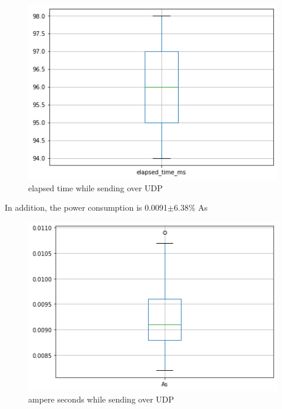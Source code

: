 \begin{figure}[h!]
\centering
\includegraphics[width = 0.7 \linewidth]{fig/udp_tcp/udp_boxplot_time.png}
\caption{elapsed time while sending over UDP}
\label{fig:udp_boxplot_time}
\end{figure}
\linebreak
In addition, the power consumption is 0.0091$\pm$6.38\% As
\linebreak
\begin{figure}[h!]
\centering
\includegraphics[width = 0.7 \linewidth]{fig/udp_tcp/udp_boxplot_As.png}
\caption{ampere seconds while sending over UDP}
\label{fig:udp_boxplot_As}
\end{figure}
\pagebreak